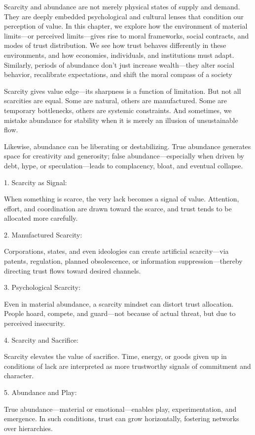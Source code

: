 \documentclass[11pt,oneside]{book}
\begin{document}
Scarcity and abundance are not merely physical states of supply and demand. They are deeply embedded psychological and cultural lenses that condition our perception of value. In this chapter, we explore how the environment of material limits—or perceived limits—gives rise to moral frameworks, social contracts, and modes of trust distribution. We see how trust behaves differently in these environments, and how economies, individuals, and institutions must adapt. Similarly, periods of abundance don't just increase wealth—they alter social behavior, recalibrate expectations, and shift the moral compass of a society

Scarcity gives value edge—its sharpness is a function of limitation. But not all scarcities are equal. Some are natural, others are manufactured. Some are temporary bottlenecks, others are systemic constraints. And sometimes, we mistake abundance for stability when it is merely an illusion of unsustainable flow.

Likewise, abundance can be liberating or destabilizing. True abundance generates space for creativity and generosity; false abundance—especially when driven by debt, hype, or speculation—leads to complacency, bloat, and eventual collapse. 


1. Scarcity as Signal:

When something is scarce, the very lack becomes a signal of value. Attention, effort, and coordination are drawn toward the scarce, and trust tends to be allocated more carefully.


2. Manufactured Scarcity:

Corporations, states, and even ideologies can create artificial scarcity—via patents, regulation, planned obsolescence, or information suppression—thereby directing trust flows toward desired channels.


3. Psychological Scarcity:

Even in material abundance, a scarcity mindset can distort trust allocation. People hoard, compete, and guard—not because of actual threat, but due to perceived insecurity.


4. Scarcity and Sacrifice:

Scarcity elevates the value of sacrifice. Time, energy, or goods given up in conditions of lack are interpreted as more trustworthy signals of commitment and character.


5. Abundance and Play:

True abundance—material or emotional—enables play, experimentation, and emergence. In such conditions, trust can grow horizontally, fostering networks over hierarchies.
\end{document}
